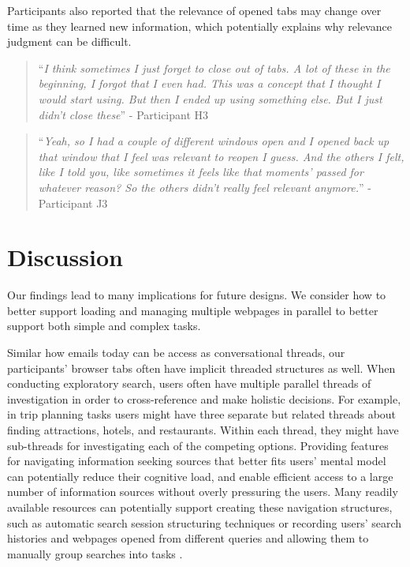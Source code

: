 Participants also reported that the relevance of opened tabs may change over time as they learned new information, which potentially explains why relevance judgment can be difficult.

\begin{quote}
``\emph{I think sometimes I just forget to close out of tabs. A lot of these in the beginning, I forgot that I even had. This was a concept that I thought I would start using. But then I ended up using something else. But I just didn't close these}'' - Participant H3
\end{quote}



\begin{quote}
``\emph{Yeah, so I had a couple of different windows open and I opened back up that window that I feel was relevant to reopen I guess. And the others I felt, like I told you, like sometimes it feels like that moments' passed for whatever reason? So the others didn't really feel relevant anymore.}'' - Participant J3
\end{quote}



\section{Discussion}

Our findings lead to many implications for future designs. We consider how to better support loading and managing multiple webpages in parallel to better support both simple and complex tasks.

Similar how emails today can be access as conversational threads, our participants' browser tabs often have implicit threaded structures as well. When conducting exploratory search, users often have multiple parallel threads of investigation in order to cross-reference and make holistic decisions. For example, in trip planning tasks users might have three separate but related threads about finding attractions, hotels, and restaurants. Within each thread, they might have sub-threads for investigating each of the competing options. Providing features for navigating information seeking sources that better fits users' mental model can potentially reduce their cognitive load, and enable efficient access to a large number of information sources without overly pressuring the users. Many readily available resources can potentially support creating these navigation structures, such as automatic search session structuring techniques \cite{jones2008beyond} or recording users' search histories and webpages opened from different queries and allowing them to manually group searches into tasks \cite{morris2008searchbar}.


